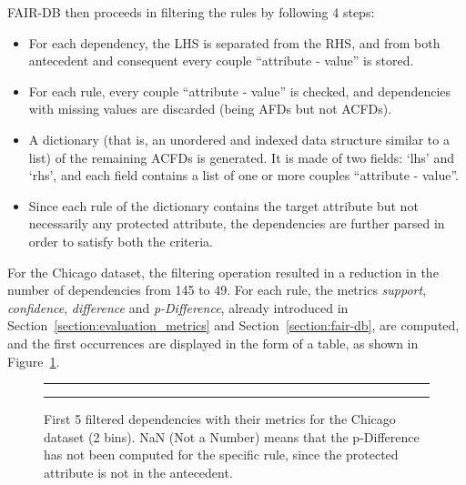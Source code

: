 \begin{itemize}
FAIR-DB then proceeds in filtering the rules by following 4 steps:
\begin{itemize}
\item[1.] For each dependency, the LHS is separated from the RHS, and from both antecedent and consequent every couple ``attribute - value'' is stored.
\item[2.] For each rule, every couple ``attribute - value'' is checked, and dependencies with missing values are discarded (being AFDs but not ACFDs).
\item[3.] A dictionary (that is, an unordered and indexed data structure similar to a list) of the remaining ACFDs is generated. It is made of two fields: `lhs' and `rhs', and each field contains a list of one or more couples ``attribute - value''.
\item[4.] Since each rule of the dictionary contains the target attribute but not necessarily any protected attribute, the dependencies are further parsed in order to satisfy both the criteria.
\end{itemize}

For the Chicago dataset, the filtering operation resulted in a reduction in the number of dependencies from 145 to 49. For each rule, the metrics \textit{support}, \textit{confidence}, \textit{difference} and \textit{p-Difference}, already introduced in Section~\ref{section:evaluation_metrics} and Section~\ref{section:fair-db}, are computed, and the first occurrences are displayed in the form of a table, as shown in Figure~\ref{fig:chicago_fair-db2}.

\begin{figure}[t!]
\centering
\noindent\rule{\linewidth}{0.4pt}\par
\noindent\rule{\linewidth}{0.4pt}
\caption{First 5 filtered dependencies with their metrics for the Chicago dataset (2 bins). NaN (Not a Number) means that the p-Difference has not been computed for the specific rule, since the protected attribute is not in the antecedent.}
\label{fig:chicago_fair-db2}
\end{figure}


\end{itemize}
